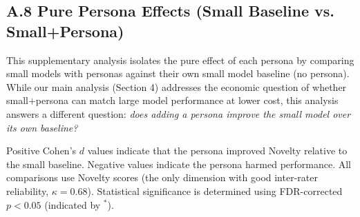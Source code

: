 \documentclass{article}
\begin{document}
\newpage
\subsection*{A.8 Pure Persona Effects (Small Baseline vs. Small+Persona)}

This supplementary analysis isolates the pure effect of each persona by comparing 
small models with personas against their own small model baseline (no persona). 
While our main analysis (Section 4) addresses the economic question of whether 
small+persona can match large model performance at lower cost, this analysis 
answers a different question: \textit{does adding a persona improve the small 
model over its own baseline?}

Positive Cohen's \(d\) values indicate that the persona improved Novelty relative 
to the small baseline. Negative values indicate the persona harmed performance. 
All comparisons use Novelty scores (the only dimension with good inter-rater 
reliability, \(\kappa = 0.68\)). Statistical significance is determined using 
FDR-corrected \(p < 0.05\) (indicated by \(^*\)).
\end{document}
